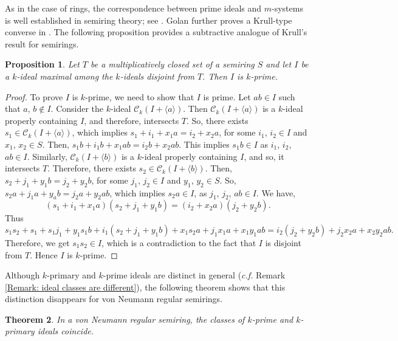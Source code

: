 \documentclass[11pt,english]{amsart}
\newtheorem{theorem}{Theorem}[section]
\newtheorem{proposition}[theorem]{Proposition}
\theoremstyle{definition}
\numberwithin{equation}{section}
\begin{document}
As in the case of rings, the correspondence between prime ideals and $m$-systems is well established in semiring theory; see \cite[Corollary 7.11]{Golan}. Golan further proves a Krull-type converse in \cite[Proposition 7.12]{Golan}. The following proposition provides a subtractive analogue of Krull’s result for semirings. 

\begin{proposition}\label{krull's theorem}
    Let $T$ be a multiplicatively closed set of a semiring $S$ and let $I$ be a $k$-ideal maximal among the $k$-ideals disjoint from $T$. Then $I$ is $k$-prime.
\end{proposition}

\begin{proof}
 To prove $I$ is $k$-prime, we need to show that $I$ is prime. Let $ab \in I$ such that $a$, $b \notin I$. Consider the $k$-ideal $\mathcal{C}_k(I+\langle a\rangle)$. Then $\mathcal{C}_k(I+\langle a\rangle)$ is a $k$-ideal properly containing $I$, and therefore, intersects $T$. So, there exists $s_1 \in \mathcal{C}_k(I+\langle a\rangle)$, which implies $s_1+i_1+x_1a=i_2+x_2a$, for some $i_1$, $i_2 \in I$ and $x_1$, $x_2 \in S$. Then, $s_1b+i_1b+x_1ab=i_2b+x_2ab$. This implies $s_1b \in I$ as $i_1$, $i_2$, $ab \in I$. Similarly, $\mathcal{C}_k(I+\langle b\rangle)$ is a $k$-ideal properly containing $I$, and so, it intersects $T$. Therefore, there exists $s_2 \in \mathcal{C}_k(I+\langle b\rangle)$. Then, $s_2+j_1+y_1b=j_2+y_2b$, for some $j_1$, $j_2 \in I$ and $y_1$, $y_2 \in S$. So, $s_2a+j_1a+y_ab=j_2a+y_2ab$, which implies $s_2a \in I$, as $j_1$, $j_2$, $ab \in I$. We have, \[(s_1+i_1+x_1a)(s_2+j_1+y_1b)=(i_2+x_2a)(j_2+y_2b).\] Thus \[s_1s_2+s_1+s_1j_1+y_1s_1b+i_1(s_2+j_1+y_1b)+x_1s_2a+j_1x_1a+x_1y_1ab=i_2(j_2+y_2b)+j_2x_2a+x_2y_2ab.\] Therefore, we get $s_1s_2 \in I$, which is a contradiction to the fact that $I$ is disjoint from $T$. Hence $I$ is $k$-prime.
\end{proof}
Although $k$-primary and $k$-prime ideals are distinct in general (\textit{c.f.} Remark \ref{Remark: ideal classes are different}), the following theorem shows that this distinction disappears for von Neumann regular semirings. 

\begin{theorem}\label{loc14}
    In a von Neumann regular semiring, the classes of $k$-prime and $k$-primary ideals coincide.
\end{theorem}
\end{document}
